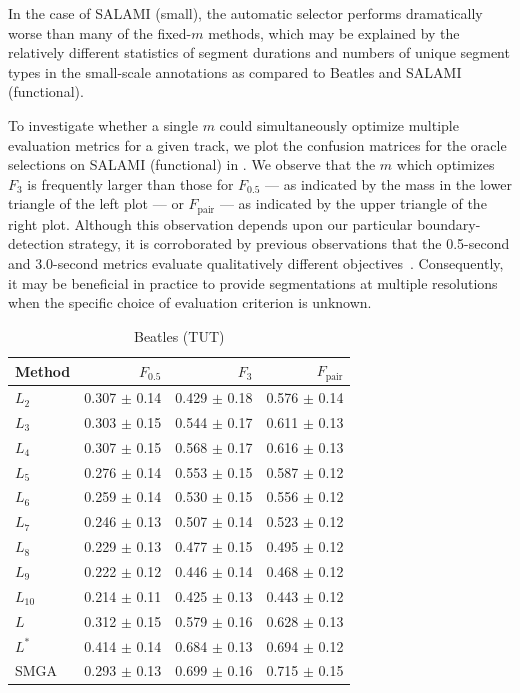 \documentclass{article}
\begin{document}
In the case of SALAMI (small), the automatic selector performs dramatically worse than
many of the fixed-$m$ methods, which may be explained by the relatively different
statistics of segment durations and numbers of unique segment types in the small-scale
annotations as compared to Beatles and SALAMI (functional).

To investigate whether a single $m$ could simultaneously optimize multiple evaluation
metrics for a given track, we plot the confusion matrices for the oracle selections on
SALAMI (functional) in .  We observe that the
$m$ which optimizes $F_3$ is frequently larger than those for $F_{0.5}$ --- as indicated by
the mass in the lower triangle of the left plot --- or $F_\text{pair}$  --- as 
indicated by the upper triangle of the right plot.  
Although this observation depends upon our particular boundary-detection
strategy, it is corroborated by previous observations that the 0.5-second and 
3.0-second metrics evaluate qualitatively different objectives~\cite{smith2013meta}.
Consequently, it may be beneficial in practice to provide segmentations at multiple 
resolutions when the specific choice of evaluation criterion is unknown.

\begin{table}
\centering
\caption{Beatles (TUT)\label{results:beatles}}
\small
\begin{tabular}{lrrr}
\toprule
Method & $F_{0.5}$ & $F_3$ & $F_\text{pair}$\\
\midrule
$L_2$   & 0.307 $\pm$ 0.14 & 0.429 $\pm$ 0.18   & 0.576 $\pm$ 0.14\\
$L_3$   & 0.303 $\pm$ 0.15 & 0.544 $\pm$ 0.17   & 0.611 $\pm$ 0.13\\
$L_4$   & 0.307 $\pm$ 0.15 & 0.568 $\pm$ 0.17   & 0.616 $\pm$ 0.13\\
$L_5$   & 0.276 $\pm$ 0.14 & 0.553 $\pm$ 0.15   & 0.587 $\pm$ 0.12\\
$L_6$   & 0.259 $\pm$ 0.14 & 0.530 $\pm$ 0.15   & 0.556 $\pm$ 0.12\\
$L_7$   & 0.246 $\pm$ 0.13 & 0.507 $\pm$ 0.14   & 0.523 $\pm$ 0.12\\
$L_8$   & 0.229 $\pm$ 0.13 & 0.477 $\pm$ 0.15   & 0.495 $\pm$ 0.12\\
$L_9$   & 0.222 $\pm$ 0.12 & 0.446 $\pm$ 0.14   & 0.468 $\pm$ 0.12\\
$L_{10}$& 0.214 $\pm$ 0.11 & 0.425 $\pm$ 0.13   & 0.443 $\pm$ 0.12\\
\midrule
$L$     & 0.312 $\pm$ 0.15 & 0.579 $\pm$ 0.16   & 0.628 $\pm$ 0.13\\
$L^*$   & 0.414 $\pm$ 0.14 & 0.684 $\pm$ 0.13   & 0.694 $\pm$ 0.12\\
\midrule
SMGA    & 0.293 $\pm$ 0.13 & 0.699 $\pm$ 0.16   & 0.715 $\pm$ 0.15\\
\bottomrule
\end{tabular}
\end{table}
\end{document}
